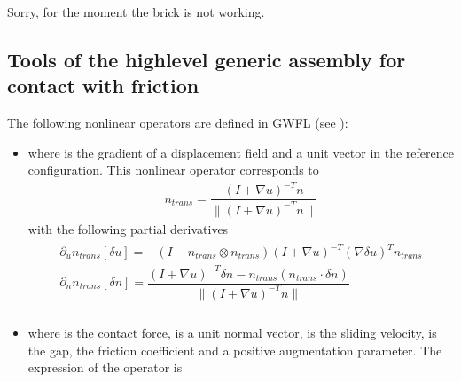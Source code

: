\documentclass[a4paper,11pt,english]{sphinxmanual}
\begin{document}
Sorry, for the moment the brick is not working.


\subsection{Tools of the high\sphinxhyphen{}level generic assembly for contact with friction}
\label{\detokenize{userdoc/model_contact_friction_large_sliding:tools-of-the-high-level-generic-assembly-for-contact-with-friction}}
The following nonlinear operators are defined in GWFL (see {\hyperref[\detokenize{userdoc/gasm_high:ud-gasm-high}]{}}):
\begin{itemize}
\item {} 
 where  is the gradient of a
displacement field and  a unit vector in the reference configuration.
This nonlinear operator corresponds to
\begin{equation*}
\begin{split}n_{trans} = \dfrac{(I+ \nabla u)^{-T} n}{\|(I+\nabla u)^{-T} n\|}\end{split}
\end{equation*}
with the following partial derivatives
\begin{align*}\!\begin{aligned}
\partial_{u} n_{trans}[\delta u] = -(I - n_{trans}\otimes n_{trans})(I+ \nabla u)^{-T}(\nabla \delta u)^T n_{trans}\\
\partial_{n} n_{trans}[\delta n] = \dfrac{(I+ \nabla u)^{-T}\delta n - n_{trans}(n_{trans}\cdot \delta n)}{\|(I+\nabla u)^{-T} n\|}\\
\end{aligned}\end{align*}
\item {} 
where  is the contact force,  is a unit normal vector, 
is the sliding velocity,  is the gap,  the friction coefficient
and  a positive augmentation parameter. The expression of the operator is
\begin{align*}\!\begin{aligned}

\end{aligned}
\end{align*}
\end{itemize}
\end{document}
